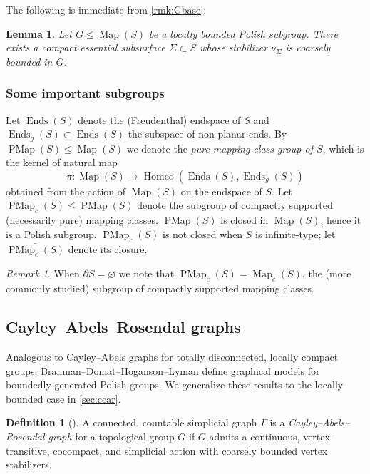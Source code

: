 \documentclass[twoside]{amsart}
\theoremstyle{plain}
\newtheorem{lemma}[theorem]{Lemma}
\theoremstyle{break}
\theoremstyle{definition}
\newtheorem{definition}[theorem]{Definition}
\theoremstyle{remark}
\newtheorem*{remark}{Remark}
\DeclareMathOperator{\Map}{Map}
\DeclareMathOperator{\Homeo}{Homeo}
\DeclareMathOperator{\Ends}{Ends}
\DeclareMathOperator{\PMap}{PMap}
\begin{document}
The following is immediate from \cref{rmk:Gbase}:
\begin{lemma}\label{lem:lb_stab_subsurface}
    Let $G\leq\Map(S)$ be a locally
  bounded Polish subgroup. There exists a compact essential subsurface
$\Sigma\subset S$ whose 
stabilizer $\nu_\Sigma$ is  coarsely bounded in $G$. 
\end{lemma}

\subsubsection*{Some important subgroups}
Let $\Ends(S)$ denote the (Freudenthal) endspace of $S$ and $\Ends_g(S) \subset
\Ends(S)$ the subspace of non-planar ends.
By $\PMap(S) \leq \Map(S)$ we denote the \textit{pure mapping class
group of $S$}, which is the kernel of natural map 
\[\pi : \Map(S) \to \Homeo(\Ends(S),\Ends_g(S))\] 
obtained from the action of $\Map(S)$
on the endspace of $S$. Let $\PMap_c(S) \leq \PMap(S)$ 
denote the subgroup of compactly supported (necessarily pure) mapping classes.  
$\PMap(S)$ is closed in $\Map(S)$, hence it is a
Polish subgroup. $\PMap_c(S)$ is not closed when $S$ is
infinite-type; let
$\overline{\PMap_c(S)}$ denote its closure.

\begin{remark}
  When $\partial S = \varnothing$ we note that $\PMap_c(S) =
  \Map_c(S)$, the (more commonly studied) subgroup of compactly
  supported mapping classes.
\end{remark}

\subsection{Cayley--Abels--Rosendal graphs}\label{sec:car}

Analogous to Cayley--Abels graphs
for totally disconnected, locally compact groups,
Branman--Domat--Hoganson--Lyman \cite{bdhl}
define graphical models for boundedly generated Polish groups.   We
generalize these results to the locally bounded case in
\cref{sec:ccar}.

\begin{definition}[{\cite[\S3]{bdhl}}]\label{def:car}
  A connected, countable simplicial graph $\Gamma$ is a
  \textit{Cayley--Abels--Rosendal graph} for a topological group $G$
  if $G$ admits a continuous, vertex-transitive, cocompact, and simplicial action
  with coarsely bounded vertex stabilizers.
\end{definition}
\end{document}
